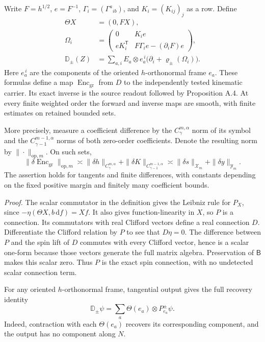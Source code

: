 \documentclass[
  english,
  11pt,
  reqno]{amsart}
\begin{document}
Write \(F=h^{1/2}\), \(e=F^{-1}\), \(\Gamma_i=(\Gamma^a{}_{ib})\), and
\(K_i=(K_{ij})_j\) as a row. Define%
 \[
\begin{aligned}
\Theta X&=(0,FX),\\
\Omega_i&=
\begin{pmatrix}
0&K_i e\\
eK_i^{\mathsf T}&F\Gamma_i e-(\partial_iF)e
\end{pmatrix},\\
\mathbb D_\pm(Z)
&=\sum_{a,i}E_a\otimes e_a^{\,i}
\bigl(\partial_i+\varrho_\pm(\Omega_i)\bigr).
\end{aligned}
\] Here \(e_a^{\,i}\) are the components of the oriented
\(h\)-orthonormal frame \(e_a\). These formulas define a map
\(\operatorname{Enc}_{\mathrm{gr}}\) from \(D\) to the independently
tested kinematic carrier. Its exact inverse is the source readout
followed by Proposition A.4. At every finite weighted order the forward
and inverse maps are smooth, with finite estimates on retained bounded
sets.

More precisely, measure a coefficient difference by the
\(C^{m,\alpha}_\gamma\) norm of its symbol and the
\(C^{m-1,\alpha}_{\gamma-1}\) norms of both zero-order coefficients.
Denote the resulting norm by \(\|\cdot\|_{\mathrm{op},m}\). On such
sets,%
 \[
\|\delta\operatorname{Enc}_{\mathrm{gr}}\|_{\mathrm{op},m}
\asymp
\|\delta h\|_{C^{m,\alpha}_\gamma}
+\|\delta K\|_{C^{m-1,\alpha}_{\gamma-1}}
\asymp \|\delta s\|_{\mathcal X_m}+\|\delta y\|_{\mathcal Y_m}.
\] The assertion holds for tangents and finite differences, with
constants depending on the fixed positive margin and finitely many
coefficient bounds.

\emph{Proof.} The scalar commutator in the definition gives the Leibniz
rule for \(P_X\), since \(-\eta(\Theta X,b\,\mathrm df)=Xf\). It also
gives function-linearity in \(X\), so \(P\) is a connection. Its
commutators with real Clifford vectors define a real connection \(D\).
Differentiate the Clifford relation by \(P\) to see that \(D\eta=0\).
The difference between \(P\) and the spin lift of \(D\) commutes with
every Clifford vector, hence is a scalar one-form because those vectors
generate the full matrix algebra. Preservation of \(\mathsf B\) makes
this scalar zero. Thus \(P\) is the exact spin connection, with no
undetected scalar connection term.

For any oriented \(h\)-orthonormal frame, tangential output gives the
full recovery identity%
 \[
\mathbb D_\pm\psi
=\sum_a\Theta(e_a)\otimes P_{e_a}^\pm\psi.
\] Indeed, contraction with each \(\Theta(e_a)\) recovers its
corresponding component, and the output has no component along \(N\).
\end{document}

